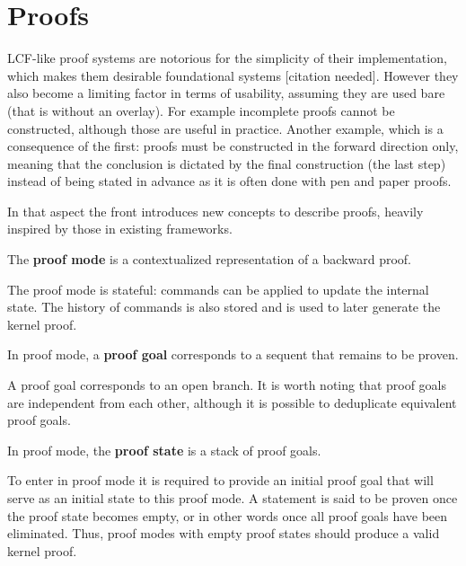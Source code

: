 \section{Proofs}
\label{sec:proofs}

LCF-like proof systems are notorious for the simplicity of their implementation, which makes them desirable foundational systems [citation needed]. However they also become a limiting factor in terms of usability, assuming they are used bare (that is without an overlay). For example incomplete proofs cannot be constructed, although those are useful in practice. Another example, which is a consequence of the first: proofs must be constructed in the forward direction only, meaning that the conclusion is dictated by the final construction (the last step) instead of being stated in advance as it is often done with pen and paper proofs.

In that aspect the front introduces new concepts to describe proofs, heavily inspired by those in existing frameworks.

\begin{definition}
The \textbf{proof mode} is a contextualized representation of a backward proof.
\end{definition}

The proof mode is stateful: commands can be applied to update the internal state. The history of commands is also stored and is used to later generate the kernel proof.

\begin{definition}
In proof mode, a \textbf{proof goal} corresponds to a sequent that remains to be proven.
\end{definition}

A proof goal corresponds to an open branch. It is worth noting that proof goals are independent from each other, although it is possible to deduplicate equivalent proof goals.

\begin{definition}
In proof mode, the \textbf{proof state} is a stack of proof goals.
\end{definition}

To enter in proof mode it is required to provide an initial proof goal that will serve as an initial state to this proof mode. A statement is said to be proven once the proof state becomes empty, or in other words once all proof goals have been eliminated. Thus, proof modes with empty proof states should produce a valid kernel proof.

